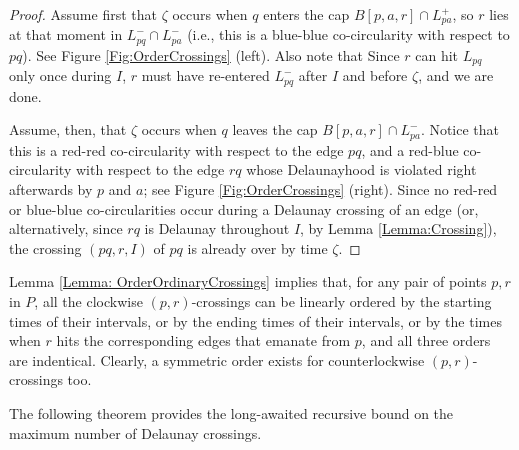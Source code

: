 \documentclass[letter,11pt]{article}
\def \L{{L}}
\begin{document}
{\begin{proof}
Assume first that $\zeta$ occurs when $q$ enters the cap $B[p,a,r]\cap \L_{pa}^+$, so
$r$ lies at that moment in $\L_{pq}^-\cap \L_{pa}^-$ (i.e., this is a blue-blue co-circularity with respect to $pq$).
See Figure \ref{Fig:OrderCrossings} (left). Also note that Since $r$ can hit $\L_{pq}$ only once during $I$, $r$ must have re-entered $\L_{pq}^-$ after $I$ and before $\zeta$, and we are done.

Assume, then, that $\zeta$ occurs when $q$ leaves the cap $B[p,a,r]\cap \L_{pa}^-$.
Notice that this is a red-red co-circularity with respect to the edge $pq$, and a red-blue co-circularity with respect to the edge $rq$ whose Delaunayhood is violated right afterwards by $p$ and $a$; see Figure \ref{Fig:OrderCrossings} (right). Since no red-red or blue-blue co-circularities occur during a Delaunay crossing of an edge (or, alternatively, since $rq$ is Delaunay throughout $I$, by Lemma \ref{Lemma:Crossing}), the crossing $(pq,r,I)$ of $pq$ is already over by time $\zeta$.
\end{proof}
}

Lemma \ref{Lemma: OrderOrdinaryCrossings} implies that, for any pair of points $p,r$ in $P$, all the clockwise $(p,r)$-crossings can be linearly ordered by the starting times of their intervals, or by the ending times of their intervals, or by the times when $r$ hits the corresponding edges that emanate from $p$, and all three orders are indentical. Clearly, a symmetric order exists for counterlockwise $(p,r)$-crossings too.







The following theorem provides the long-awaited recursive bound on the maximum number of Delaunay crossings.
\end{document}
